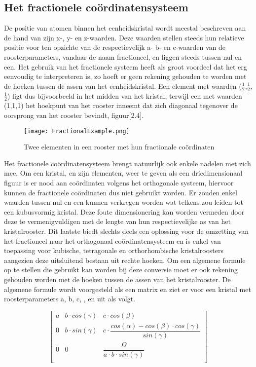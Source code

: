 \subsection{Het fractionele coördinatensysteem}
De positie van atomen binnen het eenheidskristal wordt meestal beschreven aan de hand van zijn x-, y- en z-waarden. Deze waarden stellen steeds hun relatieve positie voor ten opzichte van de respectievelijk a- b- en c-waarden van de roosterparameters, vandaar de naam fractioneel, en liggen steeds tussen nul en een. Het gebruik van het fractionele systeem heeft als groot voordeel dat het erg eenvoudig te interpreteren is, zo hoeft er geen rekening gehouden te worden met de hoeken tussen de assen van het eenheidskristal. Een element met waarden ($\frac{1}{2}$,$\frac{1}{2}$,$\frac{1}{2}$) ligt dus bijvoorbeeld in het midden van het kristal, terwijl een met waarden (1,1,1) het hoekpunt van het rooster inneemt dat zich diagonaal tegenover de oorsprong van het rooster bevindt, figuur[2.4].
\par
\begin{figure}[H]
\texttt{[image: FractionalExample.png]}
\caption{Twee elementen in een rooster met hun fractionale coördinaten}
\end{figure}
\par
Het fractionele coördinatensysteem brengt natuurlijk ook enkele nadelen met zich mee. Om een kristal, en zijn elementen, weer te geven als een driedimensionaal figuur is er nood aan coördinaten volgens het orthogonale systeem, hiervoor kunnen de fractionele coördinaten dus niet gebruikt worden. Er zouden enkel waarden tussen nul en een kunnen verkregen worden wat telkens zou leiden tot een kubusvormig kristal. Deze foute dimensionering kan worden vermeden door deze te vermenigvuldigen met de lengte van hun respectievelijke as van het kristalrooster. Dit laatste biedt slechts deels een oplossing voor de omzetting van het fractioneel naar het orthogonaal coördinatensysteem en is enkel van toepassing voor kubische, tetragonale en orthorhombische kristalroosters aangezien deze uitsluitend bestaan uit rechte hoeken. Om een algemene formule op te stellen die gebruikt kan worden bij deze conversie moet er ook rekening gehouden worden met de hoeken tussen de assen van het kristalrooster. De algemene formule wordt voorgesteld als een matrix en ziet er voor een kristal met roosterparameters a, b, c, \textalpha, \textbeta{} en \textgamma{} uit als volgt. 
\par
\[
\begin{bmatrix}
    a & b \cdot cos(\gamma) & c \cdot cos(\beta) \\
    0 & b \cdot sin(\gamma) & c \cdot \dfrac{cos(\alpha)-cos(\beta) \cdot cos(\gamma)}{sin(\gamma)}  \\
    0 & 0 & \dfrac{\Omega}{a \cdot b \cdot sin(\gamma)}\\
\end{bmatrix}
\]
